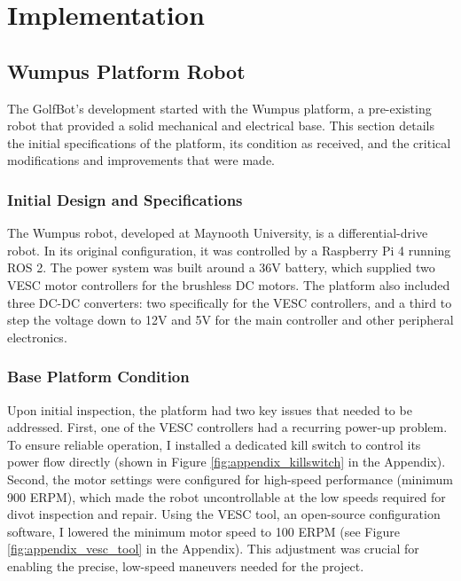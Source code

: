 \chapter{Implementation}
\label{chap:implementation}

\section{Wumpus Platform Robot}
\label{sec:wumpus_platform}
The GolfBot's development started with the Wumpus platform, a pre-existing robot that provided a solid mechanical and electrical base. This section details the initial specifications of the platform, its condition as received, and the critical modifications and improvements that were made.

\subsection{Initial Design and Specifications}
\label{ssec:initial_design}
The Wumpus robot, developed at Maynooth University, is a differential-drive robot. In its original configuration, it was controlled by a Raspberry Pi 4 running ROS 2. The power system was built around a 36V battery, which supplied two VESC motor controllers for the brushless \gls{DC} motors. The platform also included three DC-DC converters: two specifically for the VESC controllers, and a third to step the voltage down to 12V and 5V for the main controller and other peripheral electronics.

\subsection{Base Platform Condition}
\label{ssec:base_condition}
Upon initial inspection, the platform had two key issues that needed to be addressed. First, one of the VESC controllers had a recurring power-up problem. To ensure reliable operation, I installed a dedicated kill switch to control its power flow directly (shown in Figure \ref{fig:appendix_killswitch} in the Appendix). Second, the motor settings were configured for high-speed performance (minimum 900 ERPM), which made the robot uncontrollable at the low speeds required for divot inspection and repair. Using the VESC tool, an open-source configuration software, I lowered the minimum motor speed to 100 ERPM (see Figure \ref{fig:appendix_vesc_tool} in the Appendix). This adjustment was crucial for enabling the precise, low-speed maneuvers needed for the project.

